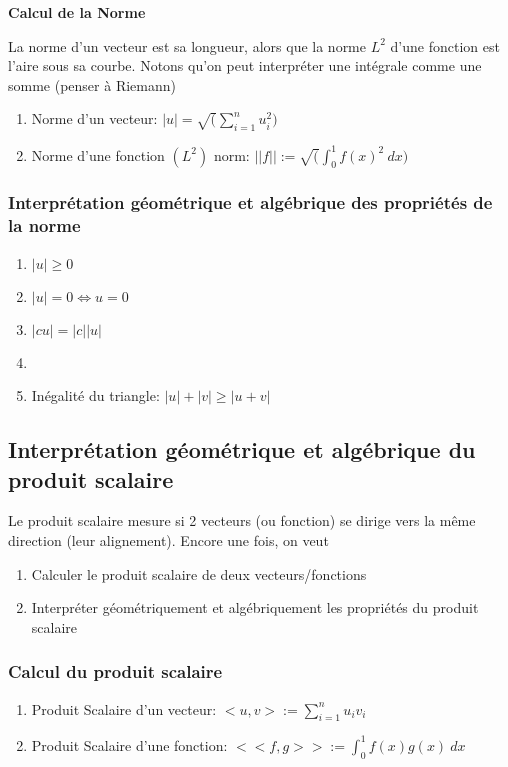 \documentclass{article}
\begin{document}
\textbf{Calcul de la Norme}

La norme d'un vecteur est sa longueur, alors que la norme $L^2$ d'une
fonction est l'aire sous sa courbe. Notons qu'on peut interpréter une
intégrale comme une somme (penser à Riemann)

\begin{enumerate}
    \item Norme d'un vecteur: $ |u| = \sqrt(\sum^{n}_{i=1} u_i ^2) $
    \item Norme d'une fonction $(L^2)$ norm: $ || f ||
	:= \sqrt(\int_{{0}}^{{1}} {f(x) ^2} \: d{x} {}	) $
\end{enumerate}

\subsubsection{Interprétation géométrique et algébrique des propriétés de la norme}

\begin{enumerate}
    \item $ | u| \geq 0 $
    \item $ | u| = 0 \Longleftrightarrow u=0 $
    \item $ |cu| = |c| |u| $
    \item
    \item Inégalité du triangle: $ |u| + |v| \geq |u+v| $
\end{enumerate}

\subsection{Interprétation géométrique et algébrique du produit scalaire}

Le produit scalaire mesure si 2 vecteurs (ou fonction) se dirige vers
la même direction (leur alignement). Encore une fois, on veut
\begin{enumerate}
    \item Calculer le produit scalaire de deux vecteurs/fonctions
    \item Interpréter géométriquement et algébriquement les propriétés
	du produit scalaire
\end{enumerate}

\subsubsection{Calcul du produit scalaire}

\begin{enumerate}
    \item Produit Scalaire d'un vecteur: $ <u,v> := \sum^{n}_{i=1} u_i v_i $
    \item Produit Scalaire d'une fonction: $ <<f,g>> :=
	\int_{{0}}^{{1}} {f(x)g(x)} \: d{x} {} $
\end{enumerate}
\end{document}
